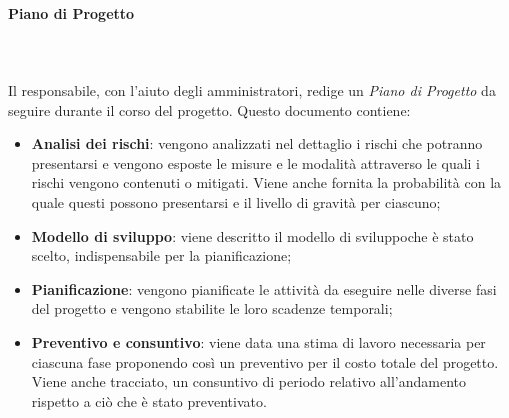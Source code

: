 \paragraph{Piano di Progetto} \mbox{}\\ \mbox{}\\
Il responsabile, con l'aiuto degli amministratori, redige un \textit{Piano di 
Progetto} da seguire durante il corso del progetto. Questo documento contiene:
	\begin{itemize}
		\item \textbf{Analisi dei rischi}: vengono analizzati nel dettaglio i rischi 
			che potranno presentarsi e vengono esposte le misure e le modalità attraverso le 
			quali i rischi vengono contenuti o mitigati. Viene anche fornita la probabilità 
			con la quale questi possono presentarsi e il livello di gravità per ciascuno;
		\item \textbf{Modello di sviluppo\glo}: viene descritto il modello di 
			sviluppo\glosp che è stato scelto, indispensabile per la pianificazione;
		\item \textbf{Pianificazione}: vengono pianificate le attività da eseguire 
			nelle diverse fasi del progetto e vengono stabilite le loro scadenze temporali;
		\item \textbf{Preventivo e consuntivo}: viene data una stima di lavoro 
			necessaria per ciascuna fase proponendo così un preventivo per il costo totale 
			del progetto. Viene anche tracciato, un consuntivo di periodo relativo 
			all'andamento rispetto a ciò che è stato preventivato.
	\end{itemize}
		
